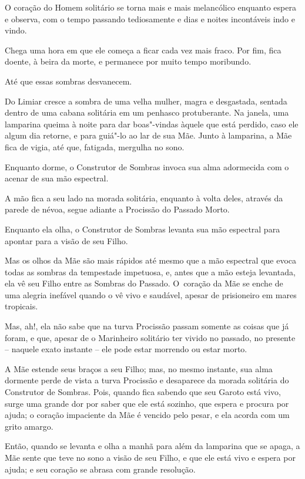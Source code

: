 O coração do Homem solitário se torna mais e mais melancólico enquanto
espera e observa, com o tempo passando tediosamente e dias e noites
incontáveis indo e vindo.

\smallskip
Chega uma hora em que ele começa a ficar cada vez mais fraco. Por fim,
fica doente, à beira da morte, e permanece por muito tempo moribundo.

Até que essas sombras desvanecem.

\smallskip
Do Limiar cresce a sombra de uma velha mulher, magra e desgastada,
sentada dentro de uma cabana solitária em um penhasco protuberante. Na
janela, uma lamparina queima à noite para dar boas"-vindas àquele que está
perdido, caso ele algum dia retorne, e para guiá"-lo ao lar de sua Mãe.
Junto à lamparina, a Mãe fica de vigia, até que, fatigada, mergulha no
sono.

Enquanto dorme, o Construtor de Sombras invoca sua alma adormecida
com o acenar de sua mão espectral.

A mão fica a seu lado na morada solitária, enquanto à volta deles, através
da parede de névoa, segue adiante a Procissão do Passado Morto.

Enquanto ela olha, o Construtor de Sombras levanta sua mão espectral
para apontar para a visão de seu Filho.

Mas os olhos da Mãe são mais rápidos até mesmo que a mão espectral que
evoca todas as sombras da tempestade impetuosa, e, antes que a mão
esteja levantada, ela vê seu Filho entre as Sombras do Passado. O~coração da Mãe se enche de uma alegria inefável quando o vê vivo e
saudável, apesar de prisioneiro em mares tropicais.

Mas, ah!, ela não sabe que na turva Procissão passam somente as coisas
que já foram, e que, apesar de o Marinheiro solitário ter vivido no
passado, no presente -- naquele exato instante -- ele pode estar morrendo
ou estar morto.

A Mãe estende seus braços a seu Filho; mas, no mesmo instante, sua alma
dormente perde de vista a turva Procissão e desaparece da morada
solitária do Construtor de Sombras. Pois, quando fica sabendo que
seu Garoto está vivo, surge uma grande dor por saber que ele está
sozinho, que espera e procura por ajuda; o coração impaciente da Mãe é
vencido pelo pesar, e ela acorda com um grito amargo.

Então, quando se levanta e olha a manhã para além da lamparina que se
apaga, a Mãe sente que teve no sono a visão de seu Filho, e que ele está vivo
e espera por ajuda; e seu coração se abrasa com grande resolução.

